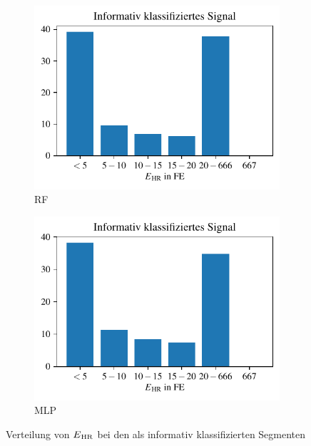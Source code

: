  \begin{figure}[H]
 	\centering
		\begin{subfigure}{.45\textwidth}
			\centering
 			\includegraphics[scale=0.7]{pic/rf-statistical-positives.pdf}
 			\caption[RF]{RF}
 		\end{subfigure}
    	\begin{subfigure}{.45\textwidth}
    		\centering
 			\includegraphics[scale=0.7]{pic/mlp-statistical-positives.pdf}
 			\caption[MLP]{MLP}
 		\end{subfigure}
 	\caption[Verteilung von $E\textsubscript{HR}$ bei den als informativ klassifizierten Segmenten nach Klassifikation mittels statistischen Merkmalen]{Verteilung von $E\textsubscript{HR}$ bei den als informativ klassifizierten Segmenten}
 	\label{fig:ml-statistical-positives}
 \end{figure}
 
